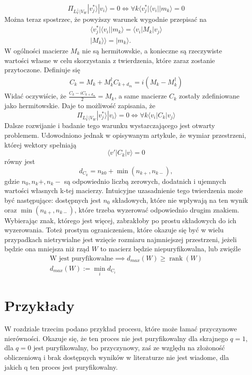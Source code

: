 \documentclass[10pt]{article} %
\DeclareMathOperator{\Rank}{rank}
\newcommand{\Ket}[1]{|#1\rangle}
\newcommand{\Bra}[1]{\langle#1|}
\newcommand{\KKet}[1]{|#1\rangle\rangle}
\newcommand{\LPV}{{L^\perp_V}}
\begin{document}
\begin{equation}
\Pi_{\LPV|V_W} \Ket{v^*_j}\Ket{v_i} = 0 \iff \forall k \Bra{v^*_j} \Bra{v_i} \Ket{m_k} = 0
\end{equation}
Można teraz spostrzec, że powyższy warunek wygodnie przepisać na
\begin{gather}
\Bra{v^*_j} \Bra{v_i} \Ket{m_k} = \Bra{v_i} M_k \Ket{v_j} \\
\KKet{M_k} = \Ket{m_k}.
\end{gather}
W ogólności macierze $M_k$ nie są hermitowskie, a konieczne są rzeczywiste wartości własne w celu skorzystania z twierdzenia, które zaraz zostanie przytoczone.
Definiuje się
\begin{gather}
C_k = M_k + M^\dag_k
C_{k+d_m} = i(M_k - M_k^\dag)
\end{gather}
Widać oczywiście, że $\frac{C_k-iC_{k+d_m}}{2} = M_k$, a same macierze $C_k$ zostały zdefiniowane jako hermitowskie. Daje to możliwość zapisania, że
\begin{equation}
\Pi_{\LPV|V_W} \Ket{v^*_j}\Ket{v_i} = 0 \iff \forall k \Bra{v_i} C_k \Ket{v_j}
\end{equation}
Dalsze rozwijanie i badanie tego warunku wystarczającego jest otwarty problemem. Udowodniono jednak w opisywanym artykule, że
wymiar przestrzeni, której wektory spełniają
\begin{equation}
\Bra{v'}C_k\Ket{v} = 0
\end{equation} równy jest 
\begin{equation}
d_{C_k} = n_{k0} + \min({n_{k+}, n_{k-}}),
\end{equation} gdzie $n_0, n_k+, n_k-$ są odpowiednio liczbą zerowych, dodatnich i ujemnych wartości własnych k-tej macierzy. Intuicyjne uzasadnienie tego twierdzenia może być następujące: dostępnych jest $n_0$ składowych, które nie wpływają na ten wynik oraz $\min({n_{k+}, n_{k-}})$, które trzeba wyzerować odpowiednio drugim znakiem. Wybierając znak, którego jest więcej, zabrakłoby po prostu składowych do ich wyzerowania.
Toteż prostym ograniczeniem, które okazuje się być w wielu przypadkach nietrywialne jest wzięcie rozmiaru najmniejszej przestrzeni, jeżeli będzie ona mniejsza niż rząd $W$ to macierz będzie niepuryfikowalna, lub zwięźle
\begin{gather}
\text{W jest puryfikowalne} \implies d_{max}(W) \geq \Rank(W) \\
d_{max}(W) := \min_i d_{C_i} 
\end{gather}
\section{Przykłady}
W rozdziale trzecim podano przykład procesu, które może łamać przyczynowe nierówności. Okazuje się, że ten proces nie jest puryfikowalny dla skrajnego $q = 1$, dla $q=0$ jest puryfikowalny, bo przyczynowy, zaś ze względu na złożoność obliczeniową i brak dostępnych wyników w literaturze nie jest wiadome, dla jakich q ten proces jest puryfikowalny.
\end{document}
